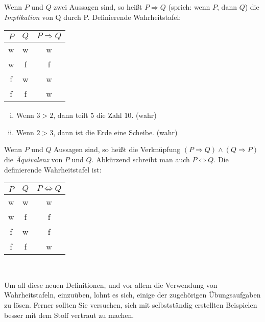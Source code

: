 \begin{mydef}
Wenn $P$ und $Q$ zwei Aussagen sind, so heißt $P \Rightarrow Q$
(sprich: wenn $P$, dann $Q$) die \textit{Implikation} von Q durch P.
Definierende Wahrheitstafel:

    \begin{tabular}{ c | c | c }
        $P$ & $Q$ & $P \Rightarrow Q$ \\
        \hline
        w & w & w \\
        w & f & f \\
        f & w & w \\
        f & f & w \\
    \end{tabular}
\end{mydef}

\begin{example}
    \begin{enumerate}[(i)]
        \item
        Wenn $ 3 > 2$, dann teilt $5$ die Zahl $10$.  (wahr)
        \item
        Wenn $2 > 3$, dann ist die Erde eine Scheibe. (wahr)
    \end{enumerate}
\end{example}

\begin{mydef}
Wenn $P$ und $Q$ Aussagen sind, so heißt die Verknüpfung
$(P \Rightarrow Q) \wedge (Q \Rightarrow P)$ die \textit{Äquivalenz} von
$P$ und $Q$.
Abkürzend schreibt man auch $P \iff Q$.
Die definierende Wahrheitstafel ist:

    \begin{tabular}{ c | c | c }
        $P$ & $Q$ & $P \iff Q$ \\
        \hline
        w & w & w \\
        w & f & f \\
        f & w & f \\
        f & f & w \\
    \end{tabular}
\end{mydef}\
\newline

Um all diese neuen Definitionen, und vor allem die Verwendung von Wahrheitstafeln,
einzuüben, lohnt es sich, einige der zugehörigen Übungsaufgaben zu lösen.
Ferner sollten Sie versuchen, sich mit selbstständig erstellten Beispielen besser
mit dem Stoff vertraut zu machen.
